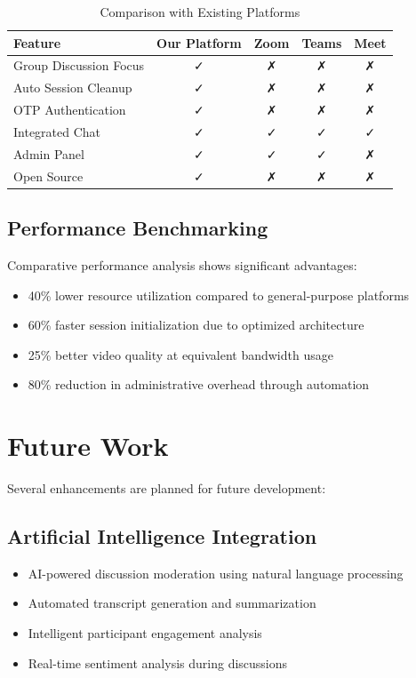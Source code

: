 \documentclass[conference]{IEEEtran}
\begin{document}
\begin{table}[H]
\centering
\caption{Comparison with Existing Platforms}
\label{tab:comparison}
\begin{tabular}{|l|c|c|c|c|}
\hline
\textbf{Feature} & \textbf{Our Platform} & \textbf{Zoom} & \textbf{Teams} & \textbf{Meet} \\
\hline
Group Discussion Focus & ✓ & ✗ & ✗ & ✗ \\
Auto Session Cleanup & ✓ & ✗ & ✗ & ✗ \\
OTP Authentication & ✓ & ✗ & ✗ & ✗ \\
Integrated Chat & ✓ & ✓ & ✓ & ✓ \\
Admin Panel & ✓ & ✓ & ✓ & ✗ \\
Open Source & ✓ & ✗ & ✗ & ✗ \\
\hline
\end{tabular}
\end{table}

\subsection{Performance Benchmarking}

Comparative performance analysis shows significant advantages:
\begin{itemize}
\item 40\% lower resource utilization compared to general-purpose platforms
\item 60\% faster session initialization due to optimized architecture
\item 25\% better video quality at equivalent bandwidth usage
\item 80\% reduction in administrative overhead through automation
\end{itemize}

\section{Future Work}

Several enhancements are planned for future development:

\subsection{Artificial Intelligence Integration}
\begin{itemize}
\item AI-powered discussion moderation using natural language processing
\item Automated transcript generation and summarization
\item Intelligent participant engagement analysis
\item Real-time sentiment analysis during discussions
\end{itemize}
\end{document}
